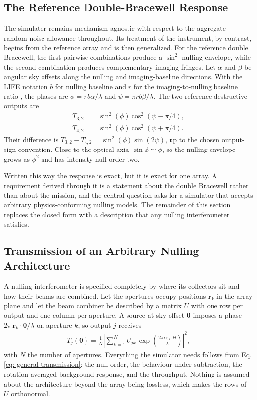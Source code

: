 \documentclass[12pt,a4paper]{article}
\numberwithin{equation}{section}
\numberwithin{figure}{section}
\numberwithin{table}{section}
\begin{document}
\subsection{The Reference Double-Bracewell Response} \label{sec: intro: null depth approach}
The simulator remains mechanism-agnostic with respect to the aggregate random-noise allowance throughout. Its treatment of the instrument, by contrast, begins from the reference array and is then generalized. For the reference double Bracewell, the first pairwise combinations produce a $\sin^2$ nulling envelope, while the second combination produces complementary imaging fringes. Let $\alpha$ and $\beta$ be angular sky offsets along the nulling and imaging-baseline directions. With the LIFE notation $b$ for nulling baseline and $r$ for the imaging-to-nulling baseline ratio \cite{dannert2022life2}, the phases are $\phi=\pi b\alpha/\lambda$ and $\psi=\pi rb\beta/\lambda$. The two reference destructive outputs are
\begin{align}
T_{3,2}&=\sin^2(\phi)\cos^2(\psi-\pi/4),\\
T_{4,2}&=\sin^2(\phi)\cos^2(\psi+\pi/4).
\end{align}
Their difference is $T_{3,2}-T_{4,2}=\sin^2(\phi)\sin(2\psi)$, up to the chosen output-sign convention. Close to the optical axis, $\sin\phi\simeq\phi$, so the nulling envelope grows as $\phi^2$ and has intensity null order two.

Written this way the response is exact, but it is exact for one array. A requirement derived through it is a statement about the double Bracewell rather than about the mission, and the central question asks for a simulator that accepts arbitrary physics-conforming nulling models. The remainder of this section replaces the closed form with a description that any nulling interferometer satisfies.

\subsection{Transmission of an Arbitrary Nulling Architecture} \label{sec: methods: combiner}
A nulling interferometer is specified completely by where its collectors sit and how their beams are combined. Let the apertures occupy positions $\mathbf{r}_k$ in the array plane and let the beam combiner be described by a matrix $U$ with one row per output and one column per aperture. A source at sky offset $\boldsymbol{\theta}$ imposes a phase $2\pi\,\mathbf{r}_k\!\cdot\!\boldsymbol{\theta}/\lambda$ on aperture $k$, so output $j$ receives
\begin{align}
T_j(\boldsymbol{\theta})=\frac{1}{N}\left|\sum_{k=1}^{N}U_{jk}\,
\exp\!\left(\frac{2\pi i\,\mathbf{r}_k\!\cdot\!\boldsymbol{\theta}}{\lambda}\right)\right|^{2},
\label{eq: general transmission}
\end{align}
with $N$ the number of apertures. Everything the simulator needs follows from Eq. \ref{eq: general transmission}: the null order, the behaviour under subtraction, the rotation-averaged background response, and the throughput. Nothing is assumed about the architecture beyond the array being lossless, which makes the rows of $U$ orthonormal.
\end{document}
